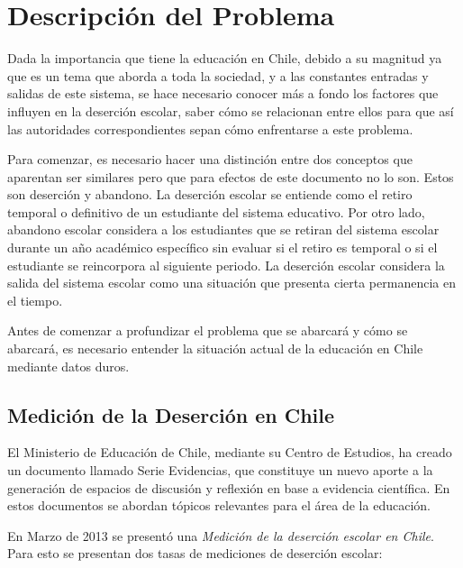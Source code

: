 \chapter{Descripción del Problema}
\label{ch:descprob}
Dada la importancia que tiene la educación en Chile, debido a su magnitud ya que es un tema que aborda a toda la sociedad, y a las constantes entradas y salidas de este sistema, se hace necesario conocer más a fondo los factores que influyen en la deserción escolar, saber cómo se relacionan entre ellos para que así las autoridades correspondientes sepan cómo enfrentarse a este problema.

Para comenzar, es necesario hacer una distinción entre dos conceptos que aparentan ser similares pero que para efectos de este documento no lo son. Estos son deserción y abandono. La deserción escolar se entiende como el retiro temporal o definitivo de un estudiante del sistema educativo. Por otro lado, abandono escolar considera a los estudiantes que se retiran del sistema escolar durante un año académico específico sin evaluar si el retiro es temporal o si el estudiante se reincorpora al siguiente periodo. La deserción escolar considera la salida del sistema escolar como una situación que presenta cierta permanencia en el tiempo\cite{mineduc}.

Antes de comenzar a profundizar el problema que se abarcará y cómo se abarcará, es necesario entender la situación actual de la educación en Chile mediante datos duros.

\newpage

\section{Medición de la Deserción en Chile}

El Ministerio de Educación de Chile, mediante su Centro de Estudios, ha creado un documento llamado Serie Evidencias, que constituye un nuevo aporte a la generación de espacios de discusión y reflexión en base a evidencia científica. En estos documentos se abordan tópicos relevantes para el área de la educación.

En Marzo de 2013 se presentó una \textit{Medición de la deserción escolar en Chile}. Para esto se presentan dos tasas de mediciones de deserción escolar\cite{serieevidencias}:

